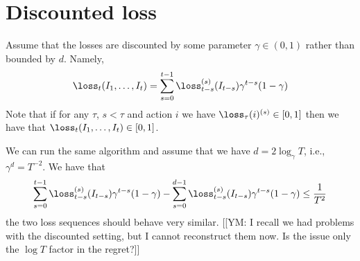 \section{Discounted loss}

Assume that the losses are discounted by some parameter $\gamma
\in(0,1)$ rather than bounded by $d$. Namely,
\[
    \loss_t(I_{1},\dots,I_t) = \sum_{s=0}^{t-1} \loss_{t-s}^{(s)}(I_{t-s})\gamma^{t-s} (1-\gamma)
\]
Note that if for any $\tau$, $s<\tau$ and action $i$ we have
$\loss_{\tau}(i)^{(s)}\in [0,1]$ then we have that
$\loss_t(I_{1},\dots,I_t)\in[0,1]$.

We can run the same algorithm and assume that we have
$d=2\log_\gamma T$, i.e., $\gamma^d=T^{-2}$. We have that
\[
\sum_{s=0}^{t-1} \loss_{t-s}^{(s)}(I_{t-s})\gamma^{t-s} (1-\gamma) -
\sum_{s=0}^{d-1} \loss_{t-s}^{(s)}(I_{t-s})\gamma^{t-s} (1-\gamma)
\leq \frac{1}{T^2}
\]
the two loss sequences should behave very similar. [[YM: I recall we
had problems with the discounted setting, but I cannot reconstruct
them now. Is the issue only the $\log T$ factor in the regret?]]
